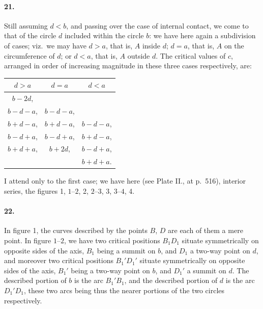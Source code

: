 \documentclass[11pt,a4paper]{article}
\theoremstyle{plain}
\begin{document}
\paragraph{21.} Still assuming $d < b$, and passing over the case of internal contact, we come to that of the circle $d$ included within the circle $b$: we have here again a subdivision of cases; viz.~we may have $d > a$, that is, $A$ inside $d$; $d = a$, that is, $A$ on the circumference of $d$; or $d < a$, that is, $A$ outside $d$. The critical values of $c$, arranged in order of increasing magnitude in these three cases respectively, are:
\begin{center}
\begin{tabular}{c|c|c}
$d > a$ & $d = a$ & $d < a$ \\
\hline
$b - 2d$, & & \\
$b - d - a$, & $b - d - a$, & \\
$b + d - a$, & $b + d - a$, & $b - d - a$, \\
$b - d + a$, & $b - d + a$, & $b + d - a$, \\
$b + d + a$, & $b + 2d$, & $b - d + a$, \\
& & $b + d + a$.
\end{tabular}
\end{center}
I attend only to the first case; we have here (see Plate II., at p.~516), interior series, the figures 1, $1\text{--}2$, 2, $2\text{--}3$, 3, $3\text{--}4$, 4.

\paragraph{22.} In figure 1, the curves described by the points $B$, $D$ are each of them a mere point. In figure $1\text{--}2$, we have two critical positions $B_1D_1$ situate symmetrically on opposite sides of the axis, $B_1$ being a summit on $b$, and $D_1$ a two-way point on $d$, and moreover two critical positions $B_1'D_1'$ situate symmetrically on opposite sides of the axis, $B_1'$ being a two-way point on $b$, and $D_1'$ a summit on $d$. The described portion of $b$ is the arc $B_1'B_1$, and the described portion of $d$ is the arc $D_1'D_1$, these two arcs being thus the nearer portions of the two circles respectively.
\end{document}
